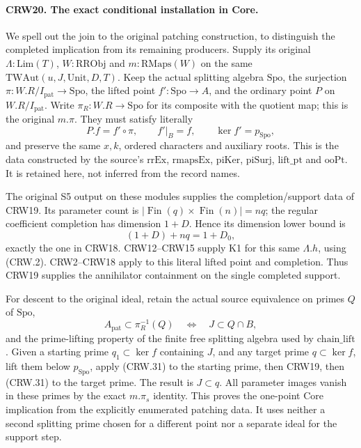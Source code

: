 \paragraph{CRW20. The exact conditional installation in Core.}
\label{claim:CRW20}
We spell out the join to the original patching construction,
to distinguish the completed implication from its remaining
producers.  Supply its original $\Lambda:\mathrm{Lim}(T)$,
$W:\mathrm{RRObj}$ and $m:\mathrm{RMaps}(W)$ on the same
$\mathrm{TWAut}(u,J,\mathrm{Unit},D,T)$.
Keep the actual splitting algebra $\mathrm{Spo}$, the
surjection $\pi:W.R/I_{\mathrm{pat}}\to\mathrm{Spo}$,
the lifted point $f':\mathrm{Spo}\to A$, and the ordinary
point $P$ on $W.R/I_{\mathrm{pat}}$.
Write $\pi_R:W.R\to\mathrm{Spo}$ for its composite
with the quotient map; this is the original $m.\pi$.
They must satisfy literally
\[
 P.f=f'\circ\pi,\qquad f'|_B=f,
 \qquad\ker f'=p_{\mathrm{Spo}},
\]
and preserve the same $x,k$, ordered characters and auxiliary
roots.  This is the data constructed by the source's
$\mathrm{rrEx}$, $\mathrm{rmapsEx}$, $\mathrm{piKer}$,
$\mathrm{piSurj}$, $\mathrm{lift\_pt}$ and $\mathrm{ooPt}$.
It is retained here, not inferred from the record names.

The original S5 output on these modules supplies
the completion/support data of CRW19.
Its parameter count is
$|\operatorname{Fin}(q)\times\operatorname{Fin}(n)|=nq$;
the regular coefficient completion has dimension $1+D$.
Hence its dimension lower bound is
\[
 (1+D)+nq=1+D_0,                                  \tag{CRW.30}
\]
exactly the one in CRW18.
CRW12--CRW15 supply K1 for this same $\Lambda.h$,
using (CRW.2).  CRW2--CRW18 apply to this literal
lifted point and completion.  Thus CRW19 supplies the
annihilator containment on the single completed support.

For descent to the original ideal, retain the actual source
equivalence on primes $Q$ of $\mathrm{Spo}$,
\[
 A_{\mathrm{pat}}\subset\pi_R^{-1}(Q)
    \quad\Longleftrightarrow\quad J\subset Q\cap B,
                                                               \tag{CRW.31}
\]
and the prime-lifting property of the finite free splitting
algebra used by $\mathrm{chain\_lift}$.
Given a starting prime $q_1\subset\ker f$ containing
$J$, and any target prime $q\subset\ker f$, lift them
below $p_{\mathrm{Spo}}$, apply (CRW.31) to the starting
prime, then CRW19, then (CRW.31) to the target prime.
The result is $J\subset q$.
All parameter images vanish in these primes by the exact
$m.\pi_s$ identity.  This proves the one-point Core
implication from the explicitly enumerated patching data.
It uses neither a second splitting prime chosen for a
different point nor a separate ideal for the support step.

